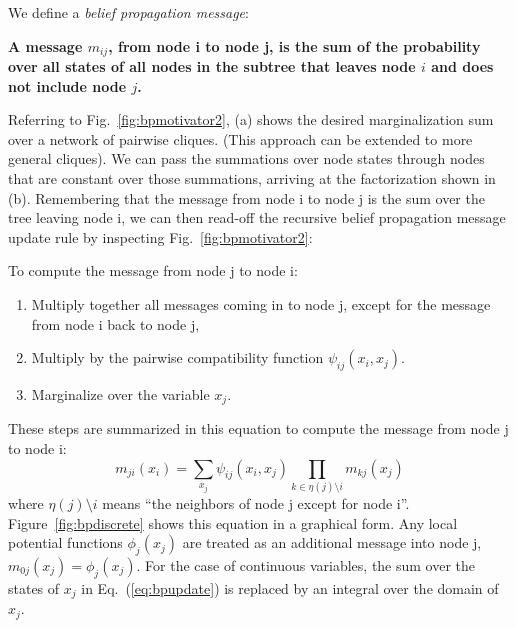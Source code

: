 We define a {\em  belief propagation message}:

{\bf A message $m_{ij}$, from node i to node j, is the sum of the
 probability over all states of all
nodes in the subtree that leaves node $i$ and does not include node $j$.}

Referring to Fig.~\ref{fig:bpmotivator2}, (a) shows the desired
marginalization sum over a network of pairwise cliques. (This approach
can be extended to more general cliques).  
We can pass the summations over node states through nodes that are
constant over those summations, arriving at the factorization shown in
(b).  Remembering that the message from node i to node j is the sum
over the tree leaving node i, we can then read-off the recursive
belief propagation message update rule by inspecting
Fig.~\ref{fig:bpmotivator2}:

To compute the message from node j to node i:
\begin{enumerate}
\item Multiply together all messages coming in to node j, except for
 the message from node i back to node j,
\item Multiply by the pairwise compatibility function $\psi_{ij}(x_i, x_j)$.
\item Marginalize over the variable $x_j$.
\end{enumerate}
These steps are summarized in this equation to compute the message
from node j to node i:
\begin{equation} 
m_{ji}(x_i) = \sum_{x_j} \psi_{ij} (x_i, x_j) 
\prod_{k\in \eta(j) \mbox{\textbackslash}   i} m_{kj}(x_j)
\label{eq:bpupdate}
\end{equation} 
where $\eta(j) \mbox{\textbackslash}   i$ means ``the neighbors of
node j except for node i''.  Figure~\ref{fig:bpdiscrete} shows this
equation in a graphical form.  Any local potential functions
$\phi_{j}(x_j)$ are treated as an additional message into node j, $m_{0j}(x_j) = \phi_{j}(x_j)$.
For the case of continuous variables, the
sum over the states of $x_j$ in Eq.~(\ref{eq:bpupdate}) is replaced by an integral over the
domain of $x_j$.


